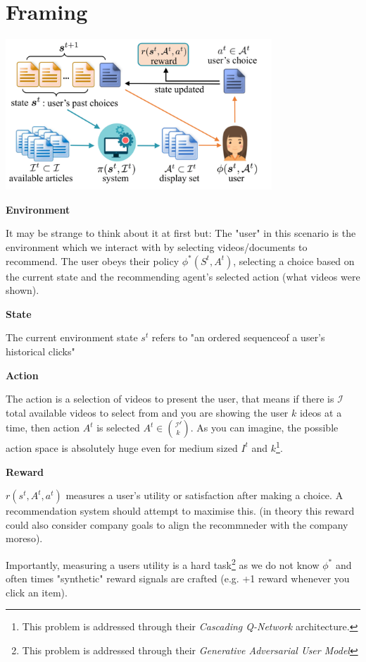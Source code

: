 \documentclass{article}
\begin{document}
    \section{Framing}
    \includegraphics[width=10cm]{fig1.png}
    
    \textbf{Environment}

    It may be strange to think about it at first but:
    The "user" in this scenario is the environment which we interact with by selecting videos/documents to recommend. The user obeys their policy $\phi ^* (S^t, A^t)$, selecting a choice based on the current state and the recommending agent's selected action (what videos were shown).

    \textbf{State}

    The current environment state $s^t$ refers to "an ordered sequenceof a user’s historical clicks"

    \textbf{Action}

    The action is a selection of videos to present the user, that means if there is $\mathcal{I}$ total available videos to select from and you are showing the user $k$ ideos at a time, then action $A^t$ is selected $A^t \in {\mathcal{I^t} \choose k}$. As you can imagine, the possible action space is absolutely huge even for medium sized $I^t$ and $k$\footnote{This problem is addressed through their \emph{Cascading Q-Network} architecture.}. 

    \textbf{Reward}

    $r(s^t, A^t, a^t)$ measures a user's utility or satisfaction after making a choice. A recommendation system should attempt to maximise this. (in theory this reward could also consider company goals to align the recommneder with the company moreso).

    Importantly, measuring a users utility is a hard task\footnote{This problem is addressed through their \emph{Generative Adversarial User Model}} as we do not know $\phi ^*$ and often times "synthetic" reward signals are crafted (e.g. +1 reward whenever you click an item).
\end{document}
